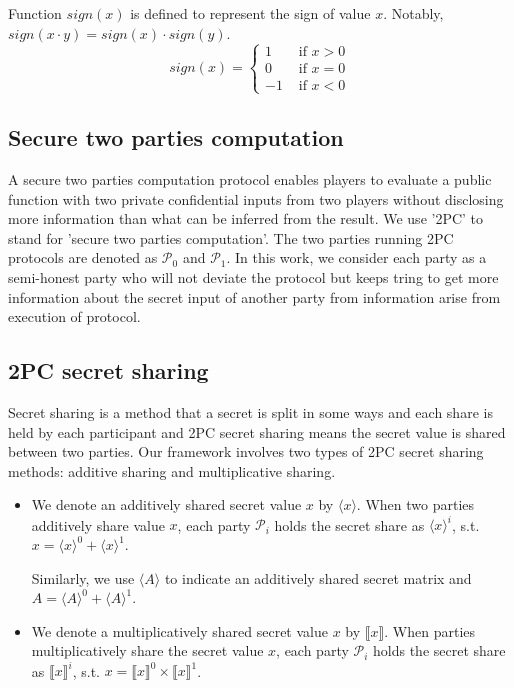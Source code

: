 \documentclass[letterpaper]{article} %
\begin{document}
    Function $sign(x)$ is defined to represent the sign of value $x$.
    Notably, $sign(x\cdot y)=sign(x)\cdot sign(y)$.
    $$sign(x)=\begin{cases}
        1 & \text{ if } x>0 \\
        0 & \text{ if } x=0\\
        -1 & \text{ if } x<0
    \end{cases}$$

    \subsection{Secure two parties computation}
    A secure two parties computation protocol enables players to evaluate a public function
    with two private confidential inputs from two players
    without disclosing more information than what can be inferred from the result.
    We use '2PC' to stand for 'secure two parties computation'.
    The two parties running 2PC protocols are denoted as $\mathcal{P}_{0} $ and $\mathcal{P}_{1}$.
    In this work, we consider each party as a semi-honest party
    who will not deviate the protocol but keeps tring to get more information about
    the secret input of another party from information arise from execution of protocol.


    \subsection{2PC secret sharing}
    Secret sharing is a method that a secret is split in some ways and each share is held by each participant
    and 2PC secret sharing means the secret value is shared between two parties.
    Our framework involves two types of 2PC secret sharing methods:
    additive sharing and multiplicative sharing.

    \begin{itemize}
        \item
        We denote an additively shared secret value $x$ by $\langle x\rangle $.
        When two parties additively share value $x$,
        each party $\mathcal{P}_{i}$ holds the secret share as $\langle x\rangle ^{i}$, s.t.
        $x=\langle x\rangle ^{0}+\langle x\rangle ^{1}$.

        Similarly, we use $\langle A\rangle $ to indicate an additively shared secret matrix
        and $A =\langle A\rangle ^{0}+\langle A\rangle ^{1}$.

        \item We denote a multiplicatively shared secret value $x$ by $\llbracket x \rrbracket$.
        When parties multiplicatively share the secret value $x$,
        each party $\mathcal{P}_{i}$ holds the secret share as $\llbracket x \rrbracket ^{i}$, s.t.
        $x=\llbracket x \rrbracket ^{0}\times \llbracket x \rrbracket ^{1}$.

    \end{itemize}
\end{document}
